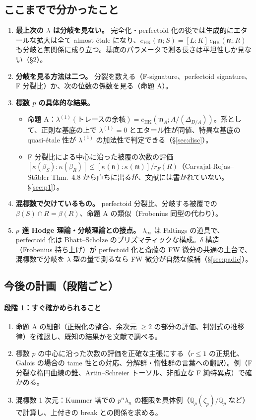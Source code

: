 \documentclass[11pt,a4paper]{ltjsarticle}
\theoremstyle{plain}
\theoremstyle{definition}
\theoremstyle{remark}
\theoremstyle{plain}
\newcommand{\m}{\mathfrak{m}}
\newcommand{\n}{\mathfrak{n}}
\newcommand{\eHK}{e_{\mathrm{HK}}}
\begin{document}
\subsection{ここまでで分かったこと}
\begin{enumerate}
  \item \textbf{最上次の $\lambda$ は分岐を見ない。} 完全化・perfectoid 化の後では生成的にエタールな拡大は全て almost étale になり、$\eHK(\m;S) = [L:K]\,\eHK(\m;R)$ も分岐と無関係に成り立つ。基底のパラメータで測る長さは平坦性しか見ない（\S 2）。
  \item \textbf{分岐を見る方法は二つ。} 分裂を数える（F-signature、perfectoid signature、F 分裂比）か、次の位数の係数を見る（命題 A）。
  \item \textbf{標数 $p$ の具体的な結果。}
  \begin{itemize}
    \item 命題 A：$\lambda^{(1)}(\text{トレースの余核}) = \eHK(\m_A;A/(\Delta_{D/A}))$。系として、正則な基底の上で $\lambda^{(1)} = 0$ とエタール性が同値、特異な基底の quasi-étale 性が $\lambda^{(1)}$ の加法性で判定できる（\S\ref{sec:disc}）。
    \item F 分裂比による中心に沿った被覆の次数の評価 $[\kappa(\beta_S):\kappa(\beta_R)]\le[\kappa(\n):\kappa(\m)]/r_F(R)$（Carvajal-Rojas--Stäbler Thm.~4.8 から直ちに出るが、文献には書かれていない。\S\ref{sec:p1}）。
  \end{itemize}
  \item \textbf{混標数で欠けているもの。} perfectoid 分裂比、分岐する被覆での $\beta(S)\cap R = \beta(R)$、命題 A の類似（Frobenius 同型の代わり）。
  \item \textbf{$p$ 進 Hodge 理論・分岐理論との接点。} $\lambda_\infty$ は Faltings の道具で、perfectoid 化は Bhatt--Scholze のプリズマティックな構成。$\delta$ 構造（Frobenius 持ち上げ）が perfectoid 化と斎藤の FW 微分の共通の土台で、混標数で分岐を $\lambda$ 型の量で測るなら FW 微分が自然な候補（\S\ref{sec:padic}）。
\end{enumerate}

\subsection{今後の計画（段階ごと）}
\paragraph{段階 1：すぐ確かめられること}
\begin{enumerate}
  \item 命題 A の細部（正規化の整合、余次元 $\ge2$ の部分の評価、判別式の推移律）を確認し、既知の結果かを文献で調べる。
  \item 標数 $p$ の中心に沿った次数の評価を正確な主張にする（$r\le1$ の正規化、Galois の場合の tame 性との対応、分解群・惰性群の言葉への翻訳）。例（F 分裂な楕円曲線の錐、Artin--Schreier トーソル、非孤立な F 純特異点）で確かめる。
  \item 混標数 1 次元：Kummer 塔での $p^n\lambda_n$ の極限を具体例（$\mathbb{Q}_p(\zeta_p)/\mathbb{Q}_p$ など）で計算し、上付きの break との関係を求める。
\end{enumerate}
\end{document}

